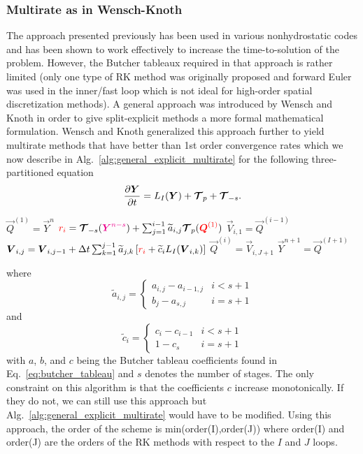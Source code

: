 \documentclass{report}
\begin{document}
\subsubsection{Multirate as in Wensch-Knoth}
The approach presented previously has been used in various nonhydrostatic codes and has been shown to work effectively to increase the time-to-solution of the problem.  However, the Butcher tableaux required in that approach is rather limited (only one type of RK method was originally proposed and forward Euler was used in the inner/fast loop which is not ideal for high-order spatial discretization methods).  A general approach was introduced by Wensch and Knoth in order to give split-explicit methods a more formal mathematical formulation.  Wensch and Knoth generalized this approach further to yield multirate methods that have better than 1st order convergence rates which we now describe in Alg.\ \ref{alg:general_explicit_multirate} for the following three-partitioned equation
\[
\frac{\partial \boldsymbol{{Y}}}{\partial t}= L_I(\boldsymbol{{Y}}) +  \boldsymbol{{\mathcal{T}}}_{p} + \boldsymbol{{\mathcal{T}}}_{-s}.
\]
\begin{algorithm}
\label{alg:general_explicit_multirate}
\begin{algorithmic}
\State
{}
\State $\vec{Q}^{(1)}=\vec{Y}^n$ 
\State $\textcolor{red}{r_i}=\boldsymbol{{\mathcal{T}}}_{-s}(\textcolor{magenta}{ \boldsymbol{{Y}}^{n-s}}) + \sum_{j=1}^{i-1} \widetilde{a}_{i,j} \boldsymbol{{\mathcal{T}}}_{p}(\textcolor{red}{\boldsymbol{{Q}}^{(1)}})$
\State $\vec{V}_{i,1}=\vec{Q}^{(i-1)}$
\State $\boldsymbol{{V}}_{i,j}=\boldsymbol{{V}}_{i,j-1} + \Delta t \sum_{k=1}^{j-1} \widetilde{a}_{j,k} \left[ \textcolor{red}{r_i} + \widetilde{c}_{i} L_I(\boldsymbol{{V}}_{i,k}) \right]$ 
\EndFor %
\State $\vec{Q}^{(i)}=\vec{V}_{i,J+1}$
\EndFor %
\State $\vec{Y}^{n+1}=\vec{Q}^{(I+1)}$
\EndFunction
\end{algorithmic}
\end{algorithm}
where 
\[
\widetilde{a}_{i,j}=\left\{
\begin{array}{cc}
  {a}_{i,j}-{a}_{i-1,j}   &  i < s+1 \\
  {b}_{j}-{a}_{s,j}   &  i = s+1  
\end{array}
\right.
\]
and
\[
\widetilde{c}_{i}=\left\{
\begin{array}{cc}
  {c}_{i}-{c}_{i-1}   &  i < s+1 \\
  1-{c}_{s}   &  i = s+1  
\end{array}
\right.
\]
with $a$, $b$, and $c$ being the Butcher tableau coefficients found in Eq.\ \eqref{eq:butcher_tableau} and $s$ denotes the number of stages.  The only constraint on this algorithm is that the coefficients $c$ increase monotonically. If they do not, we can still use this approach but Alg.\ \ref{alg:general_explicit_multirate} would have to be modified.  Using this approach, the order of the scheme is min(order(I),order(J)) where  order(I) and order(J) are the orders of the RK methods with respect to the $I$ and $J$ loops.
\end{document}
